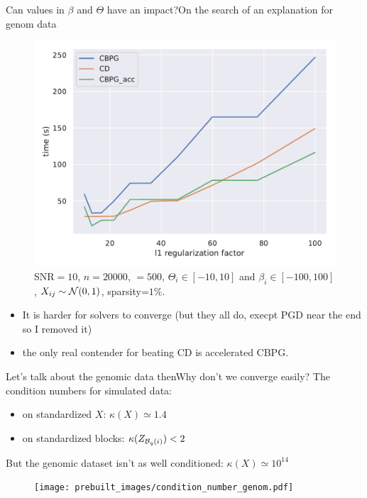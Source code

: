 \documentclass[10pt,aspectratio=43]{beamer}
\begin{document}
\begin{frame}{Can values in $\beta$ and $\Theta$ have an impact?}{On the search of an explanation for genom data}
    \begin{figure}
        \includegraphics[scale=.35]{prebuilt_images/small_simu/simulated_n20000p500_snr=10_TIME_2705_beta100_theta_10.pdf}
        \caption{SNR$=10$, $n=20000$, $=500$, $\Theta_i\in [-10, 10]$ and $\beta_i\in[-100, 100]$, $X_{ij}\sim\mathcal{N}(0, 1)$, sparsity=$1\%$.}
    \end{figure}

    \begin{itemize}
        \item It is harder for solvers to converge (but they all do, execpt PGD near the end so I removed it)
        \item the only real contender for beating CD is accelerated CBPG.
    \end{itemize}
\end{frame}


\begin{frame}{Let's talk about the genomic data then}{Why don't we converge easily?}
    The condition numbers for simulated data:
    \begin{itemize}
        \item on standardized $X$: $\kappa(X)\simeq 1.4$
        \item on standardized blocks: $\kappa(Z_{\mathcal{B}_{q}(i)}) < 2$
    \end{itemize}
    \pause
    But the genomic dataset isn't as well conditioned: $\kappa(X)\simeq 10^{14}$
    \begin{figure}
        \texttt{[image: prebuilt\_images/condition\_number\_genom.pdf]}
    \end{figure}
\end{frame}
\end{document}
